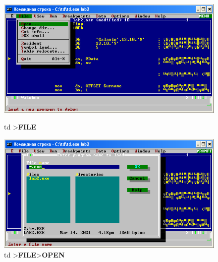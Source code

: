 \begin{figure}[!htp]
    \centering
    \begin{minipage}{0.48\textwidth}
        \centering
        \includegraphics[width=.98\linewidth]
            {../_INCLUDES/task-4-6-1/td-file.png}
        \caption{td >\textbf{FILE}}
    \end{minipage}
    \begin {minipage}{0.48\textwidth}
        \centering
        \includegraphics[width=.98\linewidth]
            {../_INCLUDES/task-4-6-1/td-file-open.png}
        \caption{td >\textbf{FILE}>\textbf{OPEN}}
    \end{minipage}
\end{figure}
